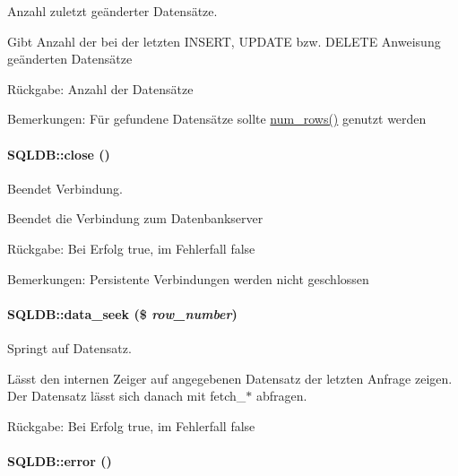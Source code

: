 Anzahl zuletzt geänderter Datensätze. 

Gibt Anzahl der bei der letzten INSERT, UPDATE bzw. DELETE Anweisung geänderten Datensätze \begin{Desc}
\item[R\"{u}ckgabe:]Anzahl der Datensätze \end{Desc}
\begin{Desc}
\item[Bemerkungen:]Für gefundene Datensätze sollte \hyperlink{classSQLDB_8b8f1f63b6172381e118b3cbc32f9f69}{num\_\-rows()} genutzt werden \end{Desc}
\hypertarget{classSQLDB_8c4f10efb418445877d7263412a082fa}{
\paragraph[close]{\setlength{\rightskip}{0pt plus 5cm}SQLDB::close ()}\hfill}
\label{classSQLDB_8c4f10efb418445877d7263412a082fa}


Beendet Verbindung. 

Beendet die Verbindung zum Datenbankserver \begin{Desc}
\item[R\"{u}ckgabe:]Bei Erfolg true, im Fehlerfall false \end{Desc}
\begin{Desc}
\item[Bemerkungen:]Persistente Verbindungen werden nicht geschlossen \end{Desc}
\hypertarget{classSQLDB_01346cc7c56480b57c76ca2dac515b2a}{
\paragraph[data\_\-seek]{\setlength{\rightskip}{0pt plus 5cm}SQLDB::data\_\-seek (\$ {\em row\_\-number})}\hfill}
\label{classSQLDB_01346cc7c56480b57c76ca2dac515b2a}


Springt auf Datensatz. 

Lässt den internen Zeiger auf angegebenen Datensatz der letzten Anfrage zeigen. Der Datensatz lässt sich danach mit fetch\_\-$\ast$ abfragen. \begin{Desc}
\item[R\"{u}ckgabe:]Bei Erfolg true, im Fehlerfall false \end{Desc}
\hypertarget{classSQLDB_c889958653ffbf14922988e1dcbe014b}{
\paragraph[error]{\setlength{\rightskip}{0pt plus 5cm}SQLDB::error ()}\hfill}
\label{classSQLDB_c889958653ffbf14922988e1dcbe014b}


